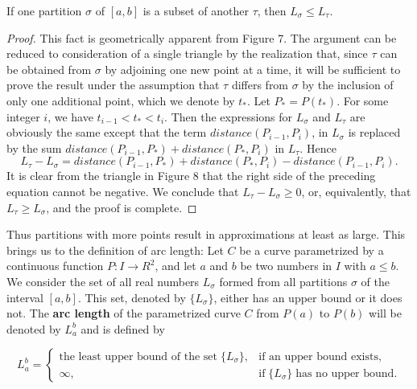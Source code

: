 
\begin{theorem} If one partition $\sigma$ of $[a, b]$ is a subset of another $\tau$, then $L_\sigma \leq L_\tau$.
\end{theorem}

\begin{proof}
This fact is geometrically apparent from Figure 7. The argument can be reduced to consideration of a single triangle by the realization that, since $\tau$ can be obtained from $\sigma$ by adjoining one new point at a time, it will be sufficient to prove the result under the assumption that $\tau$ differs from $\sigma$ by the inclusion of only one additional point, which we denote by $t_{*}$. Let $P_{*} = P(t_{*})$. For some integer $i$, we have $t_{i-1} < t_{*} < t_i$. Then the expressions for $L_\sigma$ and $L_\tau$ are obviously the same except that the term $distance(P_{i-1}, P_i)$, in $L_\sigma$ is replaced by the sum $distance(P_{i-1}, P_{*}) + distance(P_{*}, P_i)$ in $L_\tau$. Hence
$$
L_\tau - L_\sigma = distance(P_{i-1}, P_{*}) + distance(P_{*}, P_i)
- distance(P_{i-1}, P_i).
$$
It is clear from the triangle in Figure 8 that the right side of the preceding equation cannot be negative. We conclude that $L_\tau - L_\sigma \geq 0$, or, equivalently, that $L_\tau \geq L_\sigma$, and the proof is complete.
\end{proof}


Thus partitions with more points result in approximations at least as large. This brings us to the definition of arc length: Let $C$ be a curve parametrized by a continuous function $P: I \rightarrow R^2$, and let $a$ and $b$ be two numbers in $I$ with $a \leq b$. We consider the set of all real numbers $L_\sigma$ formed from all partitions $\sigma$ of the interval $[a, b]$. This set, denoted by $\{ L_\sigma \}$, either has an upper bound or it does not. The \textbf{arc length} of the parametrized curve $C$ from $P(a)$ to $P(b)$ will be denoted by $L_a^b$ and is defined by

$$
L_a^b = \left \{ \begin{array}{ll}
\mbox{the least upper bound of the set}\; \{L_\sigma \}, 
& \mbox{if an upper bound exists,}\\
\infty,                                           
& \mbox{if}\; \{ L_\sigma \} \;\mbox{has no upper bound.}
\end{array}
\right .
$$

